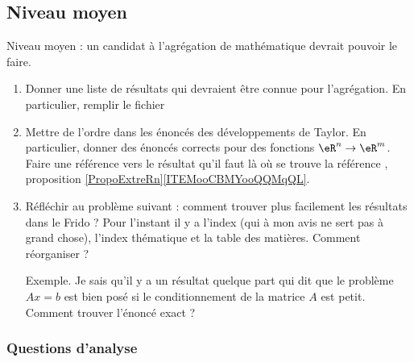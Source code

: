 \subsection{Niveau moyen}

Niveau moyen : un candidat à l'agrégation de mathématique devrait pouvoir le faire.

\begin{enumerate}
    \item
        Donner une liste de résultats qui devraient être connue pour l'agrégation. En particulier, remplir le fichier 
    \item
        Mettre de l'ordre dans les énoncés des développements de Taylor. En particulier, donner des énoncés corrects pour des fonctions \( \eR^n\to \eR^m\). Faire une référence vers le résultat qu'il faut là où se trouve la référence , proposition \ref{PropoExtreRn}\ref{ITEMooCBMYooQQMqQL}.
    \item
        Réfléchir au problème suivant : comment trouver plus facilement les résultats dans le Frido ? Pour l'instant il y a l'index (qui à mon avis ne sert pas à grand chose), l'index thématique et la table des matières. Comment réorganiser ?

        Exemple. Je sais qu'il y a un résultat quelque part qui dit que le problème \( Ax=b\) est bien posé si le conditionnement de la matrice \( A\) est petit. Comment trouver l'énoncé exact ?
\end{enumerate}


\subsubsection{Questions d'analyse}

